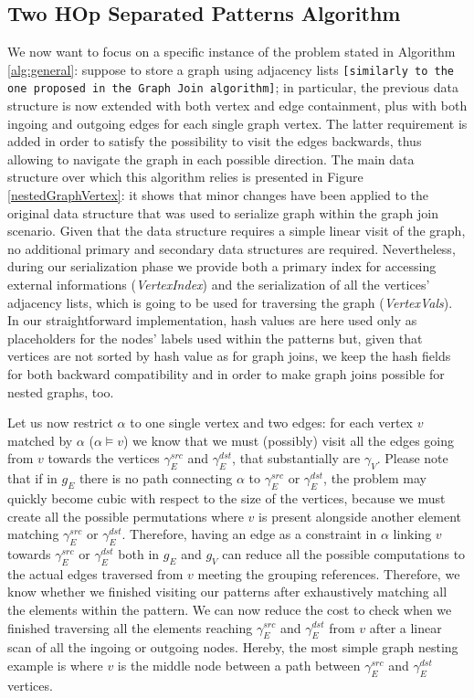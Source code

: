 \subsection{Two HOp Separated Patterns Algorithm}\label{sec:THOSPA}
We now want to focus on a specific instance of the problem stated in Algorithm \ref{alg:general}: suppose to store a graph using adjacency lists \texttt{[similarly to the one proposed in the Graph Join algorithm]}; in particular, the previous data structure is now extended with both vertex and edge containment, plus with both ingoing and outgoing edges for each single graph vertex. The latter requirement is added in order to satisfy the possibility to visit the edges backwards, thus allowing to navigate the graph in each possible direction. The main data structure over which this algorithm relies  is presented in Figure \ref{nestedGraphVertex}: it shows that minor changes have been applied to the original data structure that was used to serialize graph within the graph join scenario. %
Given that the data structure requires a simple linear visit of the graph, no additional primary and secondary data structures are required. Nevertheless, during our serialization phase we provide both a primary index for accessing external informations (\textit{VertexIndex}) and the serialization of all the vertices' adjacency lists, which is going to be used for traversing the graph (\textit{VertexVals}). In our straightforward implementation, hash values are here used only as placeholders for the nodes' labels used within the patterns but, given that vertices are not sorted by hash value as for graph joins, we keep the hash fields for both backward compatibility and in order to make graph joins possible for nested graphs, too.


Let us now restrict $\alpha$ to one single vertex and two edges: for each vertex $v$ matched by $\alpha$ ($\alpha\vDash v$) we know that we must (possibly) visit all the edges going from $v$ towards the vertices $\gamma_E^{src}$ and $\gamma_E^{dst}$, that substantially are $\gamma_V$. Please note that if in $g_E$ there is no path connecting $\alpha$ to $\gamma_E^{src}$ or $\gamma_E^{dst}$, the problem may quickly become cubic with respect to the size of the vertices, because we must create all the possible permutations where $v$ is present alongside another element matching $\gamma_E^{src}$ or $\gamma_E^{dst}$. Therefore, having an edge as a constraint in $\alpha$ linking $v$ towards $\gamma_E^{src}$ or $\gamma_E^{dst}$ both in $g_E$ and $g_V$ can reduce all the possible computations to the actual edges traversed from $v$ meeting the grouping references. Therefore, we know whether we finished visiting our patterns after exhaustively matching all the elements within the pattern. We can now reduce the cost to check when we finished traversing all the elements reaching  $\gamma_E^{src}$ and $\gamma_E^{dst}$ from $v$  after a linear scan of all the ingoing or outgoing nodes. Hereby, the most simple graph nesting example is where $v$ is the middle node between a path between $\gamma_E^{src}$ and $\gamma_E^{dst}$ vertices. 

